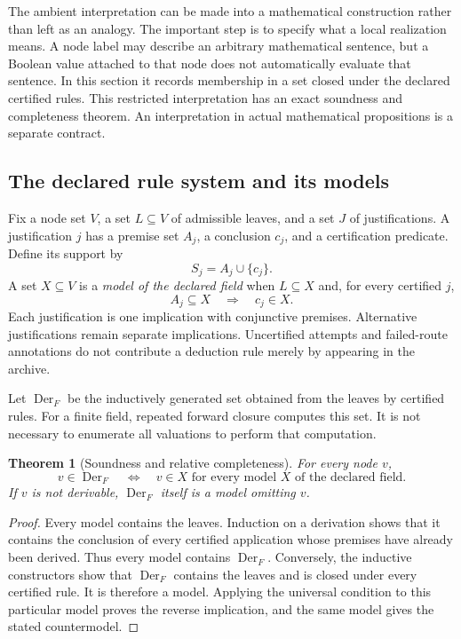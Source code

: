 \documentclass[11pt,oneside]{article}
\theoremstyle{komorebiplain}
\newtheorem{theorem}{Theorem}[section]
\theoremstyle{komorebidefinition}
\theoremstyle{komorebiremark}
\begin{document}
The ambient interpretation can be made into a mathematical construction rather than left as an analogy. The important step is to specify what a local realization means. A node label may describe an arbitrary mathematical sentence, but a Boolean value attached to that node does not automatically evaluate that sentence. In this section it records membership in a set closed under the declared certified rules. This restricted interpretation has an exact soundness and completeness theorem. An interpretation in actual mathematical propositions is a separate contract.

\subsection{The declared rule system and its models}

Fix a node set $V$, a set $L\subseteq V$ of admissible leaves, and a set $J$ of justifications. A justification $j$ has a premise set $A_j$, a conclusion $c_j$, and a certification predicate. Define its support by
\[
S_j=A_j\cup\{c_j\}.
\]
A set $X\subseteq V$ is a \emph{model of the declared field} when $L\subseteq X$ and, for every certified $j$,
\[
A_j\subseteq X\quad\Longrightarrow\quad c_j\in X.
\]
Each justification is one implication with conjunctive premises. Alternative justifications remain separate implications. Uncertified attempts and failed-route annotations do not contribute a deduction rule merely by appearing in the archive.

Let $\operatorname{Der}_F$ be the inductively generated set obtained from the leaves by certified rules. For a finite field, repeated forward closure computes this set. It is not necessary to enumerate all valuations to perform that computation.

\begin{theorem}[Soundness and relative completeness]
\label{res:24:1}
\label{thm:relative-completeness}
For every node $v$,
\[
v\in\operatorname{Der}_F
\quad\Longleftrightarrow\quad
\text{$v\in X$ for every model $X$ of the declared field}.
\]
If $v$ is not derivable, $\operatorname{Der}_F$ itself is a model omitting $v$.
\end{theorem}
\begin{proof}
Every model contains the leaves. Induction on a derivation shows that it contains the conclusion of every certified application whose premises have already been derived. Thus every model contains $\operatorname{Der}_F$. Conversely, the inductive constructors show that $\operatorname{Der}_F$ contains the leaves and is closed under every certified rule. It is therefore a model. Applying the universal condition to this particular model proves the reverse implication, and the same model gives the stated countermodel.
\end{proof}
\end{document}
